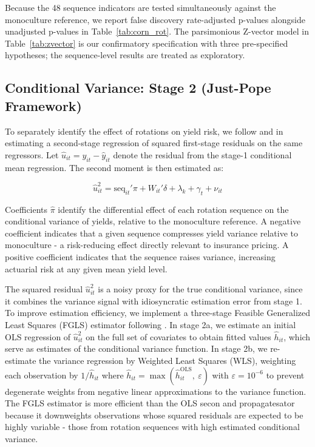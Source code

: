 \documentclass[12pt,letterpaper]{article}
\theoremstyle{remark}
\theoremstyle{remark}
\theoremstyle{plain}
\theoremstyle{definition}
\begin{document}
Because the 48 sequence indicators are tested simultaneously against the monoculture reference, we report \cite{Benjamini1995} false discovery rate-adjusted p-values alongside unadjusted p-values in Table~\ref{tab:corn_rot}. The parsimonious Z-vector model in Table~\ref{tab:zvector} is our confirmatory specification with three pre-specified hypotheses; the sequence-level results are treated as exploratory.

\subsection{\label{subsec:stage_2}Conditional Variance: Stage 2 (Just-Pope Framework)}

To separately identify the effect of rotations on yield risk, we follow \cite{Just1979} and \cite{antle1983} in estimating a second-stage regression of squared first-stage residuals on the same regressors. Let $\hat{u}_{it} = y_{it}-\hat{y}_{it}$ denote
the residual from the stage-1 conditional mean regression. The second moment is then estimated as:

\begin{equation}
    \hat{u}_{it}^2 = \text{seq}_{it}'\pi + W_{it}'\delta + \lambda_k + \gamma_t + \nu_{it}\label{eq:stage2}
\end{equation}

Coefficients $\hat{\pi}$ identify the differential effect of each rotation sequence on the conditional variance of yields, relative to the monoculture reference. A negative coefficient indicates that a given sequence compresses yield variance relative to monoculture - a risk-reducing effect directly relevant to insurance pricing. A positive coefficient indicates that the sequence raises variance, increasing actuarial risk at any given mean yield level.

The squared residual $\hat{u}_{it}^2$ is a noisy proxy for the true conditional variance, since it combines the variance signal with idiosyncratic estimation error from stage 1. To improve estimation efficiency, we implement a three-stage Feasible Generalized Least Squares (FGLS) estimator following \cite{Harvey1976}. In stage 2a, we estimate an initial OLS regression of $\hat{u}_{it}^2$ on the full set of covariates to obtain fitted values $\hat{h}_{it}$, which serve as estimates of the conditional variance function. In stage 2b, we re-estimate the variance regression by Weighted Least Squares (WLS), weighting each observation by $1/\hat{h}_{it}$ where $\hat{h}_{it}= \max(\hat{h}_{it}^{\text{OLS}},\ \varepsilon)$ with $\varepsilon = 10^{-6}$ to prevent degenerate weights from negative linear approximations to the variance function. The FGLS estimator is more efficient than the OLS secon and propagatesator because it downweights observations whose squared residuals are expected to be highly variable - those from rotation sequences with high estimated conditional variance.
\end{document}
